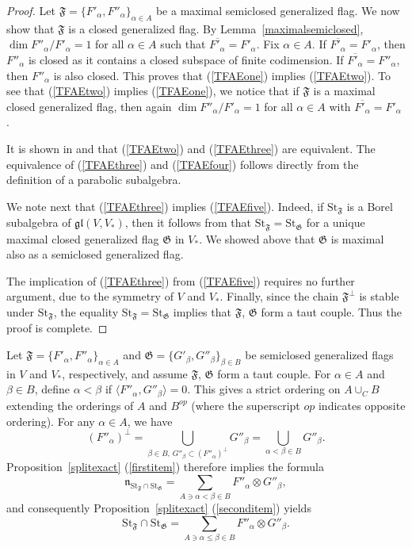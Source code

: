 \documentclass{article}
\newcommand {\St} {\mathrm{St}}
\def\gl{\mathfrak {gl}}
\def\n{\mathfrak {n}}
\def\F{\mathfrak{F}}
\def\G{\mathfrak{G}}
\begin{document}
\begin{proof}
Let $\F = \{ F'_\alpha, F''_\alpha \}_{\alpha \in A}$ be a maximal semiclosed generalized flag.  We now show that $\F$ is a closed generalized flag.  By Lemma~\ref{maximalsemiclosed}, $\dim F''_\alpha / F'_\alpha = 1$ for all $\alpha \in A$ such that $\overline{F'_\alpha} = F'_\alpha$.  Fix $\alpha \in A$.  If $\overline{F'_\alpha} = F'_\alpha$, then $F''_\alpha$ is closed as it contains a closed subspace of finite codimension.  If $\overline{F'_\alpha} = F''_\alpha$, then $F''_\alpha$ is also closed.  This proves that (\ref{TFAEone}) implies (\ref{TFAEtwo}).  To see that (\ref{TFAEtwo}) implies (\ref{TFAEone}), we notice that if $\F$ is a maximal closed generalized flag, then again $\dim F''_\alpha / F'_\alpha = 1$ for all $\alpha \in A$ with $\overline{F'_\alpha} = F'_\alpha$ \cite{DP2}.

It is shown in \cite{DP2} and \cite{D} that (\ref{TFAEtwo}) and (\ref{TFAEthree}) are equivalent.  The equivalence of (\ref{TFAEthree}) and (\ref{TFAEfour}) follows directly from the definition of a parabolic subalgebra.

We note next that (\ref{TFAEthree}) implies (\ref{TFAEfive}).  Indeed, if $\St_\F$ is a Borel subalgebra of $\gl(V,V_*)$, then it follows from \cite{DP2} that $\St_\F = \St_\G$ for a unique maximal closed generalized flag $\G$ in $V_*$.  We showed above that $\G$ is maximal also as a semiclosed generalized flag. 

The implication of (\ref{TFAEthree}) from (\ref{TFAEfive}) requires no further argument, due to the symmetry of $V$ and $V_*$.  Finally, since the chain $\F^\perp$ is stable under $\St_\F$, the equality $\St_\F = \St_\G$ implies that $\F$, $\G$ form a taut couple.  Thus the proof is complete.
\end{proof}


Let $\F = \{F'_\alpha , F''_\alpha \}_{\alpha \in A}$ and $\G= \{G'_\beta, G''_\beta \}_{\beta \in B}$ be semiclosed generalized flags in $V$ and $V_*$, respectively, and assume $\F$, $\G$ form a taut couple.  For $\alpha \in A$ and $\beta \in B$, define $\alpha < \beta$ if $\langle F''_\alpha , G''_\beta \rangle = 0$.
This gives a strict ordering on $A \cup_C B$ extending the orderings of $A$ and $B^{op}$ (where the superscript ${op}$ indicates opposite ordering).  For any $\alpha \in A$, we have 
$$(F''_\alpha)^\perp = \bigcup_{\beta \in B, \, G''_\beta \subset (F''_\alpha)^\perp} G''_\beta = \bigcup_{\alpha < \beta \in B} G''_\beta.$$
Proposition~\ref{splitexact} (\ref{firstitem}) therefore implies the formula
$$\n_{\St_\F \cap \St_\G} = \sum_{A \ni \alpha < \beta \in B} F''_\alpha \otimes G''_\beta,$$
and consequently Proposition~\ref{splitexact} (\ref{seconditem}) yields 
$$\St_\F \cap \St_\G = \sum_{A \ni \alpha \leq \beta \in B} F''_\alpha \otimes G''_\beta.$$
\end{document}
